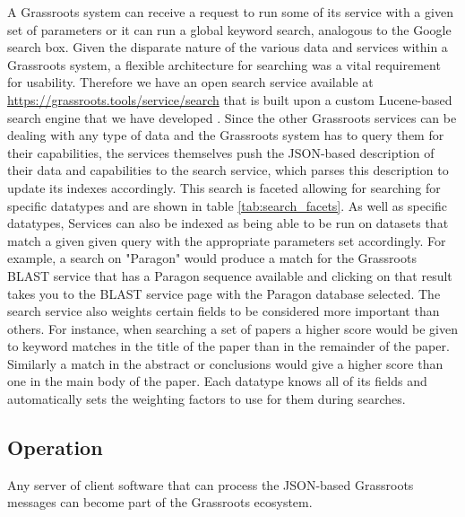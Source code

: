 \documentclass[9pt,a4paper]{extarticle}
\begin{document}
A Grassroots system can receive a request to run some of its service with a given set of parameters or it can run a global keyword search, analogous to the Google search box. 
Given the disparate nature of the various data and services within a Grassroots system, a flexible architecture for searching was a vital requirement for usability. 
Therefore we have an open search service \cite {grassroots_search} available at \href{https://grassroots.tools/service/search}{https://grassroots.tools/service/search} that is built upon a custom Lucene-based \cite {lucene} search engine that we have developed \cite {grassroots_lucene}. 
Since the other Grassroots services can be dealing with any type of data and the Grassroots system has to query them for their capabilities, the services themselves push the JSON-based description of their data and capabilities to the search service, which parses this description to update its indexes accordingly.
This search is faceted allowing for searching for specific datatypes and are shown in table \ref{tab:search_facets}. As well as specific datatypes, Services can also be indexed as being able to be run on datasets that match a given given query with the appropriate parameters set accordingly.
For example, a search on "Paragon" would produce a match for the Grassroots BLAST service that has a Paragon sequence available and clicking on that result takes you to the BLAST service page with the Paragon database selected.
The search service also weights certain fields to be considered more important than others.
For instance, when searching a set of papers a higher score would be given to keyword matches in the title of the paper than in the remainder of the paper.
Similarly a match in the abstract or conclusions would give a higher score than one in the main body of the paper.
Each datatype knows all of its fields and automatically sets the weighting factors to use for them during searches.



\subsection*{Operation}

Any server of client software that can process the JSON-based Grassroots messages can become part of the Grassroots ecosystem.
\end{document}
